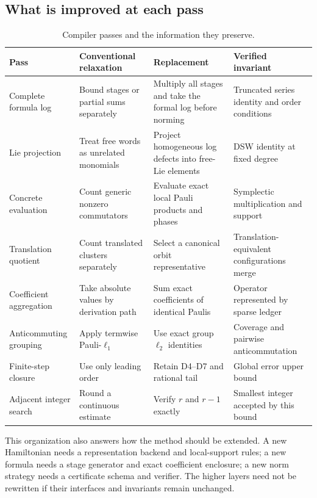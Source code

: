 \subsection{What is improved at each pass}

\begin{table}[t]
\centering
\caption{Compiler passes and the information they preserve.}
\label{tab:passes}
\begin{tabularx}{\textwidth}{@{}p{}p{}Xp{}@{}}
\toprule
Pass & Conventional relaxation & Replacement & Verified invariant \\
\midrule
Complete formula log & Bound stages or partial sums separately & Multiply all
stages and take the formal log before norming & Truncated series identity and
order conditions \\
Lie projection & Treat free words as unrelated monomials & Project homogeneous
log defects into free-Lie elements & DSW identity at fixed degree \\
Concrete evaluation & Count generic nonzero commutators & Evaluate exact local
Pauli products and phases & Symplectic multiplication and support \\
Translation quotient & Count translated clusters separately & Select a
canonical orbit representative & Translation-equivalent configurations merge \\
Coefficient aggregation & Take absolute values by derivation path & Sum exact
coefficients of identical Paulis & Operator represented by sparse ledger \\
Anticommuting grouping & Apply termwise Pauli-$\ell_1$ & Use exact group
$\ell_2$ identities & Coverage and pairwise anticommutation \\
Finite-step closure & Use only leading order & Retain D4--D7 and rational tail
& Global error upper bound \\
Adjacent integer search & Round a continuous estimate & Verify $r$ and $r-1$
exactly & Smallest integer accepted by this bound \\
\bottomrule
\end{tabularx}
\end{table}

This organization also answers how the method should be extended.  A new
Hamiltonian needs a representation backend and local-support rules; a new
formula needs a stage generator and exact coefficient enclosure; a new norm
strategy needs a certificate schema and verifier.  The higher layers need not
be rewritten if their interfaces and invariants remain unchanged.

